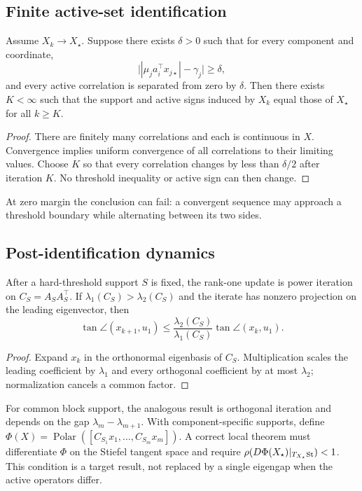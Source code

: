 \subsection{Finite active-set identification}
\begin{theorem}
\label{thm:identification}
Assume \(X_k\to X_\star\). Suppose there exists \(\delta>0\) such that for every component and coordinate,
\[
\bigl||\mu_j a_i^\top x_{j\star}|-\gamma_j\bigr|\ge\delta,
\]
and every active correlation is separated from zero by \(\delta\). Then there exists \(K<\infty\) such that the support and active signs induced by \(X_k\) equal those of \(X_\star\) for all \(k\ge K\).
\end{theorem}
\begin{proof}
There are finitely many correlations and each is continuous in \(X\). Convergence implies uniform convergence of all correlations to their limiting values. Choose \(K\) so that every correlation changes by less than \(\delta/2\) after iteration \(K\). No threshold inequality or active sign can then change.
\end{proof}
At zero margin the conclusion can fail: a convergent sequence may approach a threshold boundary while alternating between its two sides.

\subsection{Post-identification dynamics}
\begin{proposition}
\label{prop:rankone-rate}
After a hard-threshold support \(S\) is fixed, the rank-one update is power iteration on \(C_S=A_SA_S^\top\). If \(\lambda_1(C_S)>\lambda_2(C_S)\) and the iterate has nonzero projection on the leading eigenvector, then
\[
\tan\angle(x_{k+1},u_1)
\le \frac{\lambda_2(C_S)}{\lambda_1(C_S)}
\tan\angle(x_k,u_1).
\]
\end{proposition}
\begin{proof}
Expand \(x_k\) in the orthonormal eigenbasis of \(C_S\). Multiplication scales the leading coefficient by \(\lambda_1\) and every orthogonal coefficient by at most \(\lambda_2\); normalization cancels a common factor.
\end{proof}

For common block support, the analogous result is orthogonal iteration and depends on the gap \(\lambda_m-\lambda_{m+1}\). With component-specific supports, define \(\Phi(X)=\operatorname{Polar}([C_{S_1}x_1,\ldots,C_{S_m}x_m])\). A correct local theorem must differentiate \(\Phi\) on the Stiefel tangent space and require \(\rho(D\Phi(X_\star)|_{T_{X_\star}\mathrm{St}})<1\). This condition is a target result, not replaced by a single eigengap when the active operators differ.

